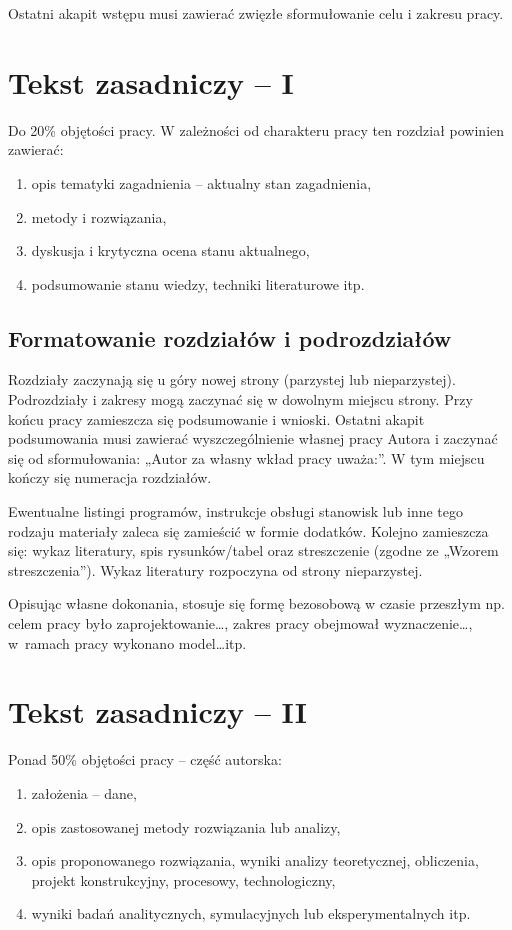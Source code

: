 \documentclass[12pt,twoside]{mwart}
\begin{document}
Ostatni akapit wstępu musi zawierać zwięzłe sformułowanie celu i zakresu pracy. 
\clearpage

\section{Tekst zasadniczy -- I}

Do 20\% objętości pracy. W zależności od charakteru pracy ten rozdział powinien zawierać:
\begin{enumerate}[label=\alph*), leftmargin=1.25cm]
	\item opis tematyki zagadnienia -- aktualny stan zagadnienia,
	\item metody i rozwiązania,
	\item dyskusja i krytyczna ocena stanu aktualnego,
	\item podsumowanie stanu wiedzy, techniki literaturowe itp.
\end{enumerate}

\subsection{Formatowanie rozdziałów i podrozdziałów}
Rozdziały zaczynają się u góry nowej strony (parzystej lub nieparzystej). Podrozdziały i zakresy mogą zaczynać się w dowolnym miejscu strony. Przy końcu pracy zamieszcza się podsumowanie i wnioski. Ostatni akapit podsumowania musi zawierać wyszczególnienie własnej pracy Autora i zaczynać się od sformułowania: „Autor za własny wkład pracy uważa:”. W tym miejscu kończy się numeracja rozdziałów.

Ewentualne listingi programów, instrukcje obsługi stanowisk lub inne tego rodzaju materiały zaleca się zamieścić w formie dodatków. Kolejno zamieszcza się: wykaz literatury, spis rysunków/tabel oraz streszczenie (zgodne ze „Wzorem streszczenia”). Wykaz literatury rozpoczyna od strony nieparzystej.

Opisując własne dokonania, stosuje się formę bezosobową w czasie przeszłym np. celem pracy było zaprojektowanie\ldots, zakres pracy obejmował wyznaczenie\ldots, w~ramach pracy wykonano model\ldots itp.
\clearpage	

\section{Tekst zasadniczy -- II}

Ponad 50\% objętości pracy -- część autorska:
\begin{enumerate}[label=\alph*), leftmargin=1.25cm] 
	\item założenia – dane,
	\item opis zastosowanej metody rozwiązania lub analizy,
	\item opis proponowanego rozwiązania, wyniki analizy teoretycznej, obliczenia, projekt konstrukcyjny, procesowy, technologiczny,
	\item wyniki badań analitycznych, symulacyjnych lub eksperymentalnych itp.
\end{enumerate}
\end{document}
